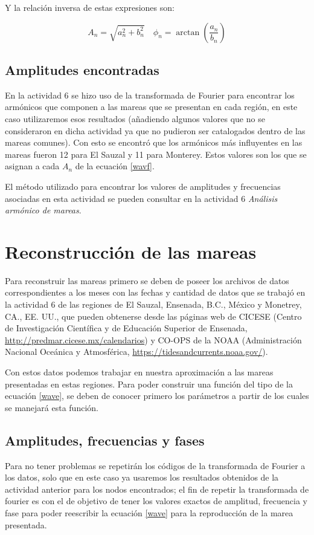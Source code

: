 Y la relación inversa de estas expresiones son:

$$A_{n}={\sqrt{a_{n}^{2}+b_{n}^{2}}}\quad \phi_{n}=\arctan\left(\frac{a_{n}}{b_{n}}\right)$$

\subsection{Amplitudes encontradas}
\noindent En la actividad 6 se hizo uso de la transformada de Fourier para encontrar los armónicos que componen a las mareas que se presentan en cada región, en este caso utilizaremos esos resultados (añadiendo algunos valores que no se consideraron en dicha actividad ya que no pudieron ser catalogados dentro de las mareas comunes). Con esto se encontró que los armónicos más influyentes en las mareas fueron 12 para El Sauzal y 11 para Monterey. Estos valores son los que se asignan a cada $A_n$ de la ecuación \ref{wavf}.

El método utilizado para encontrar los valores de amplitudes y frecuencias asociadas en esta actividad se pueden consultar en la actividad 6 \textit{Análisis armónico de mareas}\cite{act6}.

\section{Reconstrucción de las mareas}
\noindent Para reconstruir las mareas primero se deben de poseer los archivos de datos correspondientes a los meses con las fechas y cantidad de datos que se trabajó en la actividad 6 de las regiones de El Sauzal, Ensenada, B.C., México y  Monetrey, CA., EE. UU., que pueden obtenerse desde las páginas web de CICESE (Centro de Investigación Científica y de Educación Superior de Ensenada, \url{http://predmar.cicese.mx/calendarios})
y CO-OPS de la NOAA (Administración Nacional Oceánica y Atmosférica, \url{https://tidesandcurrents.noaa.gov/}).

Con estos datos podemos trabajar en nuestra aproximación a las mareas presentadas en estas regiones. Para poder construir una función del tipo de la ecuación \ref{wave}, se deben de conocer primero los parámetros a partir de los cuales se manejará esta función.

\subsection{Amplitudes, frecuencias y fases}
\noindent Para no tener problemas se repetirán los códigos de la transformada de Fourier a los datos, solo que en este caso ya usaremos los resultados obtenidos de la actividad anterior para los nodos encontrados; el fin de repetir la transformada de fourier es con el de objetivo de tener los valores exactos de amplitud, frecuencia y fase para poder reescribir la ecuación \ref{wave} para la reproducción de la marea presentada.

